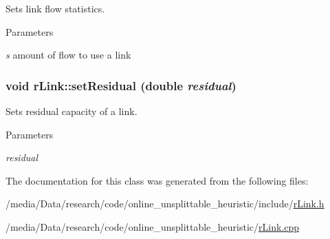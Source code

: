 Sets link flow statistics. 


\begin{DoxyParams}{Parameters}
\item[{\em s}]amount of flow to use a link \end{DoxyParams}
\hypertarget{classrLink_a7ac5fdbd1b4fc92cbfd5d8e421477148}{
\subsubsection[{setResidual}]{\setlength{\rightskip}{0pt plus 5cm}void rLink::setResidual (double {\em residual})}}
\label{classrLink_a7ac5fdbd1b4fc92cbfd5d8e421477148}


Sets residual capacity of a link. 


\begin{DoxyParams}{Parameters}
\item[{\em residual}]\end{DoxyParams}


The documentation for this class was generated from the following files:\begin{DoxyCompactItemize}
\item 
/media/Data/research/code/online\_\-unsplittable\_\-heuristic/include/\hyperlink{rLink_8h}{rLink.h}\item 
/media/Data/research/code/online\_\-unsplittable\_\-heuristic/\hyperlink{rLink_8cpp}{rLink.cpp}\end{DoxyCompactItemize}
